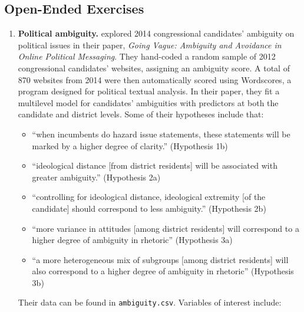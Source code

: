 \documentclass[
]{krantz}
\providecommand{\tightlist}{%
  \setlength{\itemsep}{0pt}\setlength{\parskip}{0pt}}
\begin{document}
\subsection{Open-Ended Exercises}\label{open-ended-exercises-4}

\begin{enumerate}
\def\labelenumi{\arabic{enumi}.}
\item
  \textbf{Political ambiguity.} \citet{Chapp2018} explored 2014 congressional candidates' ambiguity on political issues in their paper, \emph{Going Vague: Ambiguity and Avoidance in Online Political Messaging}. They hand-coded a random sample of 2012 congressional candidates' websites, assigning an ambiguity score. A total of 870 websites from 2014 were then automatically scored using Wordscores, a program designed for political textual analysis. In their paper, they fit a multilevel model for candidates' ambiguities with predictors at both the candidate and district levels. Some of their hypotheses include that:

  \begin{itemize}
  \tightlist
  \item
    ``when incumbents do hazard issue statements, these statements will be marked by a higher degree of clarity.'' (Hypothesis 1b)
  \item
    ``ideological distance {[}from district residents{]} will be associated with greater ambiguity.'' (Hypothesis 2a)
  \item
    ``controlling for ideological distance, ideological extremity {[}of the candidate{]} should correspond to less ambiguity.'' (Hypothesis 2b)
  \item
    ``more variance in attitudes {[}among district residents{]} will correspond to a higher degree of ambiguity in rhetoric'' (Hypothesis 3a)
  \item
    ``a more heterogeneous mix of subgroups {[}among district residents{]} will also correspond to a higher degree of ambiguity in rhetoric'' (Hypothesis 3b)
  \end{itemize}

  Their data can be found in \texttt{ambiguity.csv}. Variables of interest include:


\end{enumerate}
\end{document}
